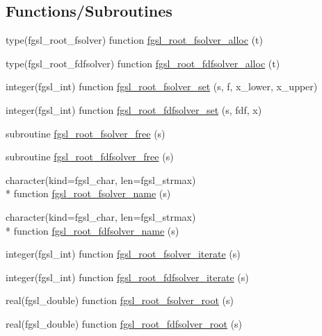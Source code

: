 \subsection*{Functions/\-Subroutines}
\begin{DoxyCompactItemize}
\item 
type(fgsl\-\_\-root\-\_\-fsolver) function \hyperlink{roots_8finc_a9e423996b996cace4445b0b7c8d49c47}{fgsl\-\_\-root\-\_\-fsolver\-\_\-alloc} (t)
\item 
type(fgsl\-\_\-root\-\_\-fdfsolver) function \hyperlink{roots_8finc_a754a00901764d3a2702b28492377d31f}{fgsl\-\_\-root\-\_\-fdfsolver\-\_\-alloc} (t)
\item 
integer(fgsl\-\_\-int) function \hyperlink{roots_8finc_a4eaeff2b5c48b40a60627201b0ed2a1c}{fgsl\-\_\-root\-\_\-fsolver\-\_\-set} (s, f, x\-\_\-lower, x\-\_\-upper)
\item 
integer(fgsl\-\_\-int) function \hyperlink{roots_8finc_ad5cfd8eab01316799d223177c8902c2f}{fgsl\-\_\-root\-\_\-fdfsolver\-\_\-set} (s, fdf, x)
\item 
subroutine \hyperlink{roots_8finc_ab651ed93d541399c16b925c81eda546d}{fgsl\-\_\-root\-\_\-fsolver\-\_\-free} (s)
\item 
subroutine \hyperlink{roots_8finc_a35459afca718dd3a99651e5e993f46a3}{fgsl\-\_\-root\-\_\-fdfsolver\-\_\-free} (s)
\item 
character(kind=fgsl\-\_\-char, len=fgsl\-\_\-strmax) \\*
function \hyperlink{roots_8finc_a8f1354b9512e43ae0af0752cb4a29f0b}{fgsl\-\_\-root\-\_\-fsolver\-\_\-name} (s)
\item 
character(kind=fgsl\-\_\-char, len=fgsl\-\_\-strmax) \\*
function \hyperlink{roots_8finc_a949c461b3543e81b68a43e4fd100e88b}{fgsl\-\_\-root\-\_\-fdfsolver\-\_\-name} (s)
\item 
integer(fgsl\-\_\-int) function \hyperlink{roots_8finc_a16e821dd161b28bc9cd5ff5e68358915}{fgsl\-\_\-root\-\_\-fsolver\-\_\-iterate} (s)
\item 
integer(fgsl\-\_\-int) function \hyperlink{roots_8finc_aabdb1cc46e7b7bd1bdf6d70756c1f414}{fgsl\-\_\-root\-\_\-fdfsolver\-\_\-iterate} (s)
\item 
real(fgsl\-\_\-double) function \hyperlink{roots_8finc_abd614e562da9a1d0f498ad9705a5bf17}{fgsl\-\_\-root\-\_\-fsolver\-\_\-root} (s)
\item 
real(fgsl\-\_\-double) function \hyperlink{roots_8finc_aa56f439a45653c3ad87c4dab8bce52cc}{fgsl\-\_\-root\-\_\-fdfsolver\-\_\-root} (s)

\end{DoxyCompactItemize}

